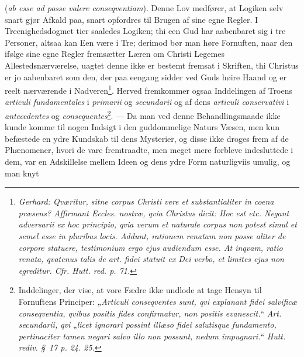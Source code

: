 \documentclass[12pt]{book}
\newcommand{\opage}[1]{\marginnote{\footnotesize\textit{[#1]}}}
\begin{document}
(\textit{ab esse ad posse valere conseqventiam}). Denne
\opage{79} \setcounter{footnote}{0}%
Lov medfører, at Logiken selv snart gjør Afkald paa, snart opfordres til
Brugen af sine egne Regler. I Treenighedsdogmet tier saaledes Logiken; thi
een Gud har aabenbaret sig i tre Personer, altsaa kan Een være i Tre; derimod
bør man høre Fornuften, naar den ifølge sine egne Regler fremsætter Læren om
Christi Legemes Allestedsnærværelse, uagtet denne ikke er bestemt fremsat i
Skriften, thi Christus er jo aabenbaret som den, der paa eengang sidder ved
Guds høire Haand og er reelt nærværende i
Nadveren\footnote{\textit{Gerhard: Qværitur, sitne corpus Christi vere et
substantialiter in coena præsens? Affirmant Eccles. nostræ, qvia Christus
dicit: \emph{Hoc est} etc. Negant adversarii ex hoc principio, qvia verum et
naturale corpus non potest simul et semel esse in pluribus locis. Addunt,
rationem renatam non posse aliter de corpore statuere, testimonium ergo ejus
audiendum esse. At inqvam, ratio renata, qvatenus talis de art. fidei statuit
ex Dei verbo, et limites ejus non egreditur. Cfr. Hutt. red. p. 71.}}. Herved
fremkommer ogsaa Inddelingen af Troens \textit{articuli fundamentales} i
\textit{primarii} og \textit{secundarii} og af dens \textit{articuli
conservativi} i \textit{antecedentes} og
\textit{consequentes}\footnote{Inddelinger, der vise, at vore Fædre ikke
undlode at tage Hensyn til Fornuftens Principer: „\textit{Articuli
\emph{conseqventes} sunt, qvi explanant fidei salvificæ conseqventia, qvibus
positis fides confirmatur, \emph{non positis} evanescit.}“ \textit{Art.
\emph{secundarii}, qvi} „\textit{licet ignorari possint illæso fidei
salutisque fundamento, pertinaciter tamen negari salvo illo non possunt,
nedum impugnari.}“ \textit{Hutt. rediv. §~17 p. 24. 25.}}. --- Da man ved
denne Behandlingsmaade ikke kunde komme til nogen Indsigt i den guddommelige
Naturs Væsen, men kun befæstede en ydre Kundskab til dens Mysterier, og disse
ikke droges frem af de Phænomener, hvori de vare fremtraadte, men meget mere
forbleve indesluttede i dem, var en Adskillelse mellem Ideen og dens ydre
Form naturligviis umulig, og man knyt\-%
\end{document}
